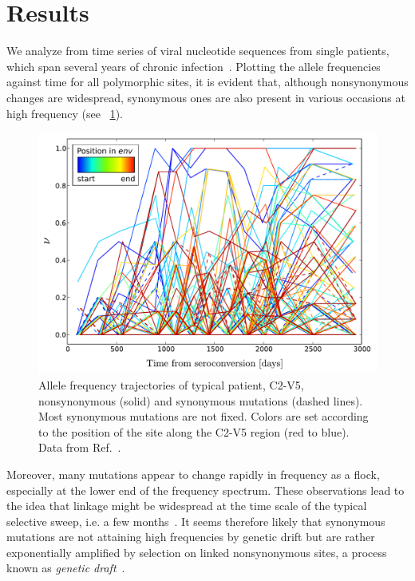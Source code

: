 \documentclass[12pt,a4paper,notitlepage,onecolumn]{article}
\begin{document}
\section{Results}
We analyze from time series of viral nucleotide sequences from single patients,
which span several years of chronic
infection~\citep{shankarappa_consistent_1999, bunnik_autologous_2008,
liu_selection_2006}. Plotting the allele frequencies against time for all
polymorphic sites, it is evident that, although nonsynonymous changes are
widespread, synonymous ones are also present in various occasions at high
frequency (see \figurename~\ref{fig:aft}).
\begin{figure}
\begin{center}
\includegraphics[width=\linewidth]{Shankarappa_allele_freqs_trajectories_syn_nonsynp8}
\caption{Allele frequency trajectories of typical patient, C2-V5, nonsynonymous
(solid) and synonymous mutations (dashed lines). Most synonymous mutations are
not fixed. Colors are set according to the position of the site along the C2-V5
region (red to blue). Data from Ref.~\cite{shankarappa_consistent_1999}.}
\label{fig:aft}
\end{center}
\end{figure}
Moreover, many mutations appear to change rapidly in frequency as a flock,
especially at the lower end of the frequency spectrum. These observations lead
to the idea that linkage might be widespread at the time scale of the typical
selective sweep, i.e. a few months~\citep{neher_recombination_2010}. It seems
therefore likely that synonymous mutations are not attaining high frequencies by
genetic drift but are rather exponentially amplified by selection on linked
nonsynonymous sites, a process known as {\it genetic
draft}~\citep{neher_genetic_2011}.
\end{document}
